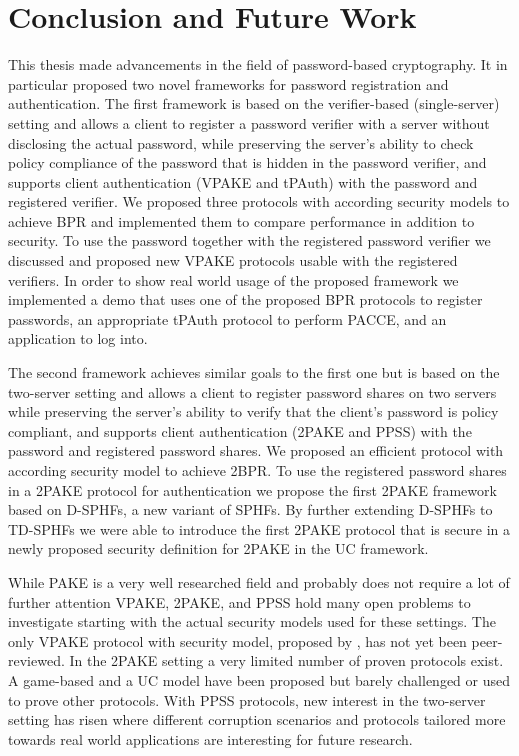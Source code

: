 \chapter{Conclusion and Future Work} \label{ch:conclusion}

This thesis made advancements in the field of password-based cryptography.
It in particular proposed two novel frameworks for password registration and authentication.
The first framework is based on the verifier-based (single-server) setting and allows a client to register a password verifier with a server without disclosing the actual password, while preserving the server's ability to check policy compliance of the password that is hidden in the password verifier, and supports client authentication (\ac{VPAKE} and \ac{tPAuth}) with the password and registered verifier.
We proposed three protocols with according security models to achieve \acl{BPR} and implemented them to compare performance in addition to security.
To use the password together with the registered password verifier we discussed and proposed new \ac{VPAKE} protocols usable with the registered verifiers.
In order to show real world usage of the proposed framework we implemented a demo that uses one of the proposed \ac{BPR} protocols to register passwords, an appropriate \ac{tPAuth} protocol to perform \acl{PACCE}, and an application to log into.

The second framework achieves similar goals to the first one but is based on the two-server setting and allows a client to register password shares on two servers while preserving the server's ability to verify that the client's password is policy compliant, and supports client authentication (\ac{2PAKE} and \ac{PPSS}) with the password and registered password shares.
We proposed an efficient protocol with according security model to achieve \acl{2BPR}.
To use the registered password shares in a \ac{2PAKE} protocol for authentication we propose the first \ac{2PAKE} framework based on \aclp{D-SPHF}, a new variant of \acp{SPHF}.
By further extending \acp{D-SPHF} to \acp{TD-SPHF} we were able to introduce the first \ac{2PAKE} protocol that is secure in a newly proposed security definition for \ac{2PAKE} in the \ac{UC} framework.

While \ac{PAKE} is a very well researched field and probably does not require a lot of further attention \ac{VPAKE}, \ac{2PAKE}, and \ac{PPSS} hold many open problems to investigate starting with the actual security models used for these settings.
The only \ac{VPAKE} protocol with security model, proposed by \citet{BenhamoudaP13}, has not yet been peer-reviewed.
In the \ac{2PAKE} setting a very limited number of proven protocols exist.
A game-based and a \ac{UC} model have been proposed but barely challenged or used to prove other protocols.
With \ac{PPSS} protocols, new interest in the two-server setting has risen where different corruption scenarios and protocols tailored more towards real world applications are interesting for future research.

